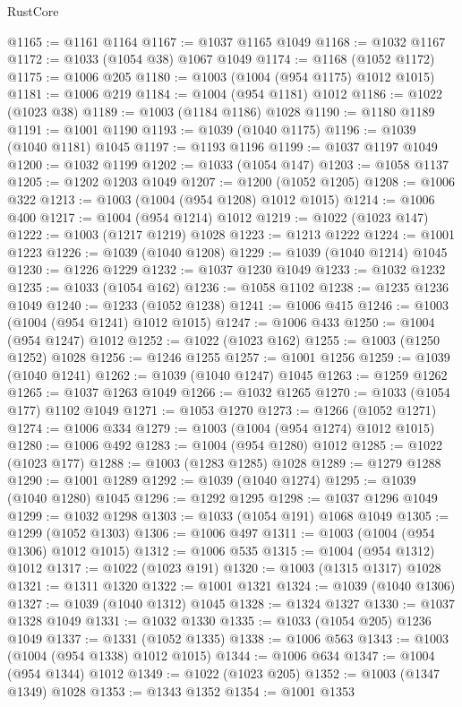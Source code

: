 \begin{lexlean}{RustCore}
\begin{coremodule}
@1165 := @1161 @1164
@1167 := @1037 @1165 @1049
@1168 := @1032 @1167
@1172 := @1033 (@1054 @38) @1067 @1049
@1174 := @1168 (@1052 @1172)
@1175 := @1006 @205
@1180 := @1003 (@1004 (@954 @1175) @1012 @1015)
@1181 := @1006 @219
@1184 := @1004 (@954 @1181) @1012
@1186 := @1022 (@1023 @38)
@1189 := @1003 (@1184 @1186) @1028
@1190 := @1180 @1189
@1191 := @1001 @1190
@1193 := @1039 (@1040 @1175)
@1196 := @1039 (@1040 @1181) @1045
@1197 := @1193 @1196
@1199 := @1037 @1197 @1049
@1200 := @1032 @1199
@1202 := @1033 (@1054 @147)
@1203 := @1058 @1137
@1205 := @1202 @1203 @1049
@1207 := @1200 (@1052 @1205)
@1208 := @1006 @322
@1213 := @1003 (@1004 (@954 @1208) @1012 @1015)
@1214 := @1006 @400
@1217 := @1004 (@954 @1214) @1012
@1219 := @1022 (@1023 @147)
@1222 := @1003 (@1217 @1219) @1028
@1223 := @1213 @1222
@1224 := @1001 @1223
@1226 := @1039 (@1040 @1208)
@1229 := @1039 (@1040 @1214) @1045
@1230 := @1226 @1229
@1232 := @1037 @1230 @1049
@1233 := @1032 @1232
@1235 := @1033 (@1054 @162)
@1236 := @1058 @1102
@1238 := @1235 @1236 @1049
@1240 := @1233 (@1052 @1238)
@1241 := @1006 @415
@1246 := @1003 (@1004 (@954 @1241) @1012 @1015)
@1247 := @1006 @433
@1250 := @1004 (@954 @1247) @1012
@1252 := @1022 (@1023 @162)
@1255 := @1003 (@1250 @1252) @1028
@1256 := @1246 @1255
@1257 := @1001 @1256
@1259 := @1039 (@1040 @1241)
@1262 := @1039 (@1040 @1247) @1045
@1263 := @1259 @1262
@1265 := @1037 @1263 @1049
@1266 := @1032 @1265
@1270 := @1033 (@1054 @177) @1102 @1049
@1271 := @1053 @1270
@1273 := @1266 (@1052 @1271)
@1274 := @1006 @334
@1279 := @1003 (@1004 (@954 @1274) @1012 @1015)
@1280 := @1006 @492
@1283 := @1004 (@954 @1280) @1012
@1285 := @1022 (@1023 @177)
@1288 := @1003 (@1283 @1285) @1028
@1289 := @1279 @1288
@1290 := @1001 @1289
@1292 := @1039 (@1040 @1274)
@1295 := @1039 (@1040 @1280) @1045
@1296 := @1292 @1295
@1298 := @1037 @1296 @1049
@1299 := @1032 @1298
@1303 := @1033 (@1054 @191) @1068 @1049
@1305 := @1299 (@1052 @1303)
@1306 := @1006 @497
@1311 := @1003 (@1004 (@954 @1306) @1012 @1015)
@1312 := @1006 @535
@1315 := @1004 (@954 @1312) @1012
@1317 := @1022 (@1023 @191)
@1320 := @1003 (@1315 @1317) @1028
@1321 := @1311 @1320
@1322 := @1001 @1321
@1324 := @1039 (@1040 @1306)
@1327 := @1039 (@1040 @1312) @1045
@1328 := @1324 @1327
@1330 := @1037 @1328 @1049
@1331 := @1032 @1330
@1335 := @1033 (@1054 @205) @1236 @1049
@1337 := @1331 (@1052 @1335)
@1338 := @1006 @563
@1343 := @1003 (@1004 (@954 @1338) @1012 @1015)
@1344 := @1006 @634
@1347 := @1004 (@954 @1344) @1012
@1349 := @1022 (@1023 @205)
@1352 := @1003 (@1347 @1349) @1028
@1353 := @1343 @1352
@1354 := @1001 @1353

\end{coremodule}
\end{lexlean}
